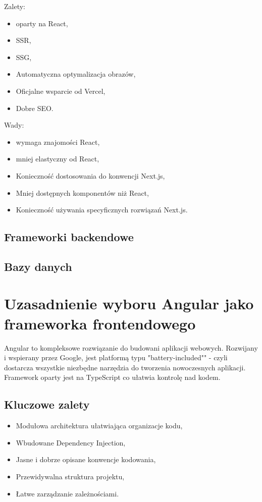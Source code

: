 Zalety:
\begin{itemize}
	\item oparty na React,
	\item SSR,
	\item SSG,
	\item Automatyczna optymalizacja obrazów,
	\item Oficjalne wsparcie od Vercel,
	\item Dobre SEO.
\end{itemize}

Wady:
\begin{itemize}
	\item wymaga znajomości React,
	\item mniej elastyczny od React,
	\item Konieczność dostosowania do konwencji Next.js,
	\item Mniej dostępnych komponentów niż React,
	\item Konieczność używania specyficznych rozwiązań Next.js.
\end{itemize}

\subsection{Frameworki backendowe}

\subsection{Bazy danych}

\section{Uzasadnienie wyboru Angular jako frameworka frontendowego}

Angular to kompleksowe rozwiązanie do budowani aplikacji webowych. Rozwijany i wspierany przez Google, jest platformą typu "battery-included"" - czyli dostarcza wszystkie niezbędne narzędzia do tworzenia nowoczesnych aplikacji. Framework oparty jest na TypeScript co ułatwia kontrolę nad kodem.

\subsection{Kluczowe zalety}
\begin{itemize}
	\item Modułowa architektura ułatwiająca organizacje kodu,
	\item Wbudowane Dependency Injection,
	\item Jasne i dobrze opisane konwencje kodowania,
	\item Przewidywalna struktura projektu,
	\item Łatwe zarządzanie zależnościami.
\end{itemize}

